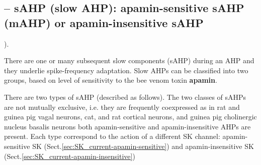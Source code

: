 \subsection{-- sAHP (slow AHP): apamin-sensitive sAHP (mAHP) or
apamin-insensitive sAHP} \label{sec:AHP-slow}).

There are one or many subsequent slow components (sAHP) during an AHP and they
underlie spike-frequency adaptation. Slow AHPs can be classified into two 
groups,  based  on  level of sensitivity  to  the bee  venom  toxin  {\bf
apamin}.


There are two types of sAHP (described as follows). The two classes of sAHPs are
not mutually exclusive, i.e. they are frequently coexpressed as in rat and
guinea pig vagal neurons, cat, and rat cortical neurons, and guinea pig
cholinergic nucleus basalis neurons  both apamin-sensitive and
apamin-insensitive AHPs are present.
Each type correspond to the action of a different SK channel: apamin-sensitive
SK (Sect.\ref{sec:SK_current-apamin-sensitive}) and apamin-insensitive SK
(Sect.\ref{sec:SK_current-apamin-insensitive})

